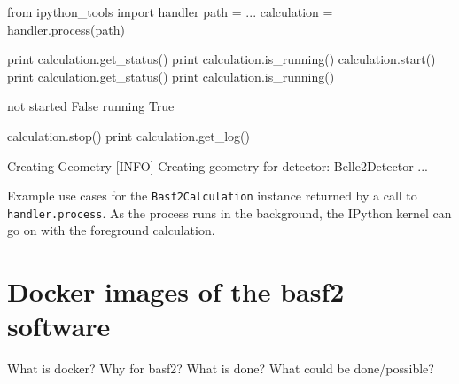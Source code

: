 \begin{listing}
\begin{inputipynb}
from ipython_tools import handler
path = ...
calculation = handler.process(path)
\end{inputipynb}
\begin{inputipynb}
print calculation.get_status()
print calculation.is_running()
calculation.start()
print calculation.get_status()
print calculation.is_running()
\end{inputipynb}
\begin{outputipynb}
not started
False
running
True
\end{outputipynb}
\begin{inputipynb}
calculation.stop()
print calculation.get_log()
\end{inputipynb}
\begin{outputipynb}[\theipythcntr]
[INFO] Creating Geometry
[INFO] Creating geometry for detector: Belle2Detector
...
\end{outputipynb}

  \caption[Example use cases for the Basf2Calculation objects.]{Example use cases for the \texttt{Basf2Calculation} instance returned by a call to \texttt{handler.process}. As the process runs in the background, the IPython kernel can go on with the foreground calculation.}
  \label{lis-calculation}
\end{listing}

\section{Docker images of the basf2 software}

What is docker?
Why for basf2?
What is done?
What could be done/possible?
